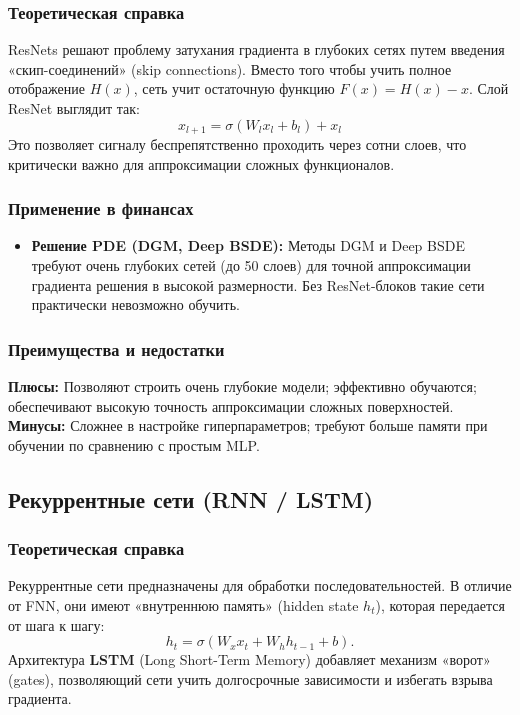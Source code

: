 \subsubsection{Теоретическая справка}
ResNets решают проблему затухания градиента в глубоких сетях путем введения «скип-соединений» (skip connections). Вместо того чтобы учить полное отображение $H(x)$, сеть учит остаточную функцию $F(x) = H(x) - x$. Слой ResNet выглядит так:
\begin{equation}
    x_{l+1} = \sigma \left( W_l x_l + b_l \right) + x_l
\end{equation}
Это позволяет сигналу беспрепятственно проходить через сотни слоев, что критически важно для аппроксимации сложных функционалов.

\subsubsection{Применение в финансах}
\begin{itemize}
    \item \textbf{Решение PDE (DGM, Deep BSDE):} Методы DGM \cite{Sirignano2018} и Deep BSDE \cite{Han2018} требуют очень глубоких сетей (до 50 слоев) для точной аппроксимации градиента решения в высокой размерности. Без ResNet-блоков такие сети практически невозможно обучить.
\end{itemize}

\subsubsection{Преимущества и недостатки}
\textbf{Плюсы:} Позволяют строить очень глубокие модели; эффективно обучаются; обеспечивают высокую точность аппроксимации сложных поверхностей. \\
\textbf{Минусы:} Сложнее в настройке гиперпараметров; требуют больше памяти при обучении по сравнению с простым MLP.

\subsection{Рекуррентные сети (RNN / LSTM)}

\subsubsection{Теоретическая справка}
Рекуррентные сети предназначены для обработки последовательностей. В отличие от FNN, они имеют «внутреннюю память» (hidden state $h_t$), которая передается от шага к шагу:
\begin{equation}
    h_t = \sigma(W_x x_t + W_h h_{t-1} + b).
\end{equation}
Архитектура \textbf{LSTM} (Long Short-Term Memory) добавляет механизм «ворот» (gates), позволяющий сети учить долгосрочные зависимости и избегать взрыва градиента.

